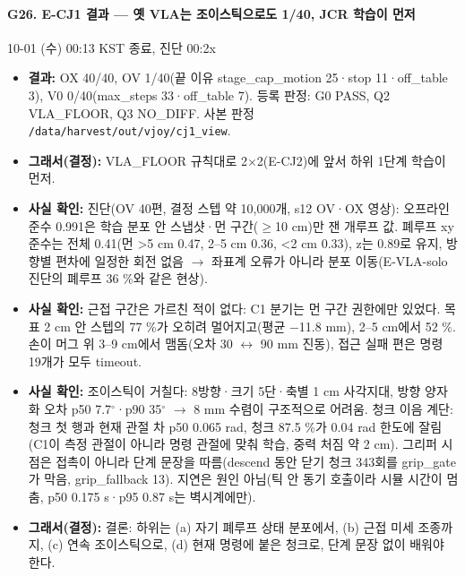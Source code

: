 \paragraph{G26. E-CJ1 결과 --- 옛 VLA는 조이스틱으로도 1/40, JCR 학습이 먼저}
{\small 10-01 (수) 00:13 KST 종료, 진단 00:2x}
\begin{itemize}
  \item \textbf{결과:} OX 40/40, OV 1/40(끝 이유 stage\_cap\_motion 25·stop 11·off\_table 3), V0 0/40(max\_steps 33·off\_table 7). 등록 판정: G0 PASS, Q2 VLA\_FLOOR, Q3 NO\_DIFF. 사본 판정 \texttt{/\allowbreak{}data/\allowbreak{}harvest/\allowbreak{}out/\allowbreak{}vjoy/\allowbreak{}cj1\_\allowbreak{}view}.
  \item \textbf{그래서(결정):} VLA\_FLOOR 규칙대로 2$\times$2(E-CJ2)에 앞서 하위 1단계 학습이 먼저.
  \item \textbf{사실 확인:} 진단(OV 40편, 결정 스텝 약 10,000개, s12 OV·OX 영상): 오프라인 준수 0.991은 학습 분포 안 스냅샷·먼 구간($\geq$10 cm)만 잰 개루프 값. 폐루프 xy 준수는 전체 0.41(먼 >5 cm 0.47, 2--5 cm 0.36, <2 cm 0.33), z는 0.89로 유지, 방향별 편차에 일정한 회전 없음 $\rightarrow$ 좌표계 오류가 아니라 분포 이동(E-VLA-solo 진단의 폐루프 36 \%와 같은 현상).
  \item \textbf{사실 확인:} 근접 구간은 가르친 적이 없다: C1 분기는 먼 구간 권한에만 있었다. 목표 2 cm 안 스텝의 77 \%가 오히려 멀어지고(평균 $-$11.8 mm), 2--5 cm에서 52 \%. 손이 머그 위 3--9 cm에서 맴돔(오차 30 $\leftrightarrow$ 90 mm 진동), 접근 실패 편은 명령 19개가 모두 timeout.
  \item \textbf{사실 확인:} 조이스틱이 거칠다: 8방향·크기 5단·축별 1 cm 사각지대, 방향 양자화 오차 p50 7.7$^\circ$·p90 35$^\circ$ $\rightarrow$ 8 mm 수렴이 구조적으로 어려움. 청크 이음 계단: 청크 첫 행과 현재 관절 차 p50 0.065 rad, 청크 87.5 \%가 0.04 rad 한도에 잘림(C1이 측정 관절이 아니라 명령 관절에 맞춰 학습, 중력 처짐 약 2 cm). 그리퍼 시점은 접촉이 아니라 단계 문장을 따름(descend 동안 닫기 청크 343회를 grip\_gate가 막음, grip\_fallback 13). 지연은 원인 아님(틱 안 동기 호출이라 시뮬 시간이 멈춤, p50 0.175 s·p95 0.87 s는 벽시계에만).
  \item \textbf{그래서(결정):} 결론: 하위는 (a) 자기 폐루프 상태 분포에서, (b) 근접 미세 조종까지, (c) 연속 조이스틱으로, (d) 현재 명령에 붙은 청크로, 단계 문장 없이 배워야 한다.
\end{itemize}

